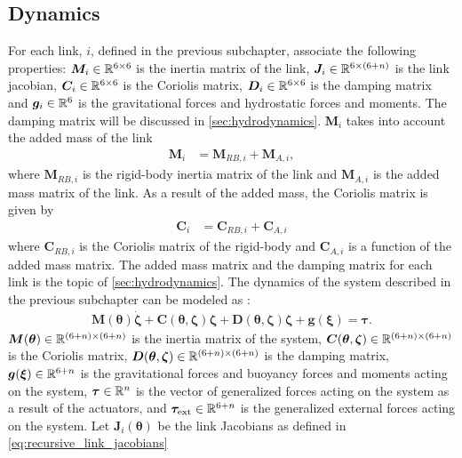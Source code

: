 

\subsection{Dynamics}

For each link, $i$, defined in the previous subchapter, associate the following
properties: $\bm{M}_i \in \mathbb{R}^{6 \times 6}$ is the inertia matrix of the link,
$\bm{J}_i \in \mathbb{R}^{6 \times (6+n)}$ is the link jacobian, $\bm{C}_i \in \mathbb{R}^{6 \times 6}$
is the Coriolis matrix, $\bm{D}_i \in \mathbb{R}^{6 \times 6}$ is the damping matrix and
$\bm{g}_i \in \mathbb{R}^{6}$ is the gravitational forces and hydrostatic forces and moments.
The damping matrix will be discussed in \autoref{sec:hydrodynamics}.
$\bm{M}_i$ takes into account the added mass of the link
\begin{align}
    \bm{M}_i &= \bm{M}_{RB,i} + \bm{M}_{A,i},
\end{align}
where $\bm{M}_{RB,i}$ is the rigid-body inertia matrix of the link and $\bm{M}_{A,i}$
is the added mass matrix of the link. As a result of the added mass, the Coriolis
matrix is given by
\begin{align}
    \bm{C}_i &= \bm{C}_{RB,i} + \bm{C}_{A,i}
\end{align}
where $\bm{C}_{RB,i}$ is the Coriolis matrix of the rigid-body and $\bm{C}_{A,i}$
is a function of the added mass matrix. The added mass matrix and the damping matrix
for each link is the topic of \autoref{sec:hydrodynamics}. The dynamics of the
system described in the previous subchapter can be modeled as
\cite{from2014}:
\begin{align}
    \bm{M}(\bm{\theta})\dot{\bm{\zeta}} +
        \bm{C}(\bm{\theta}, \bm{\zeta}) \bm{\zeta} +
        \bm{D}(\bm{\theta}, \bm{\zeta}) \bm{\zeta} +
        \bm{g}(\bm{\xi}) =
        \bm{\tau}. \label{eq:robot_dynamics}
\end{align}
$\bm{M}(\bm{\theta}) \in \mathbb{R}^{(6+n)\times(6+n)}$  is the inertia matrix of the
system, $\bm{C}(\bm{\theta}, \bm{\zeta}) \in \mathbb{R}^{(6+n)\times(6+n)}$ is the
Coriolis matrix, $\bm{D}(\bm{\theta}, \bm{\zeta}) \in \mathbb{R}^{(6+n)\times(6+n)}$ is
the damping matrix, $\bm{g}(\bm{\xi}) \in \mathbb{R}^{6+n}$ is the gravitational forces
and buoyancy forces and moments acting on the system, $\bm{\tau} \in \mathbb{R}^{n}$ is the vector of generalized
forces acting on the system as a result of the actuators,
and $\bm{\tau}_{\mathrm{ext}} \in \mathbb{R}^{6+n}$ is the
generalized external forces acting on the system. Let $\bm{J}_{i}(\bm{\theta})$
be the link Jacobians as defined in \autoref{eq:recursive_link_jacobians}
